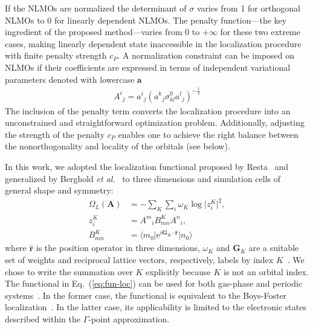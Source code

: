 \documentclass[aps,prl,reprint,amsmath,amssymb]{revtex4-1}
\newcommand*{\imi}{i} %
\newcommand*{\E}{\mathrm{e}}
\newcommand{\ket}[1]{\ensuremath{\vert #1 \rangle}}
\newcommand{\bra}[1]{\ensuremath{\langle #1 \vert}}
\newcommand{\op}[1]{\ensuremath{\hat{#1}}} %
\begin{document}
If the NLMOs are normalized the determinant of $\sigma$ varies from 1 for orthogonal NLMOs to 0 for linearly dependent NLMOs. The penalty function---the key ingredient of the proposed method---varies from 0 to $+\infty$ for these two extreme cases, making linearly dependent state inaccessible in the localization procedure with finite penalty strength $c_P$. 
A normalization constraint can be imposed on NLMOs if their coefficients are expressed in terms of independent variational parameters denoted with lowercase $\mathbf{a}$
%
\begin{equation}
\begin{split}
{A^i}_j = {a^i}_{j} ({a^k}_{j} \sigma^0_{kl}{a^l}_{j})^{-\frac{1}{2}}
\end{split}
\end{equation}
%
The inclusion of the penalty term converts the localization procedure into an unconstrained and straightforward optimization problem. Additionally, adjusting the strength of the penalty $c_P$ enables one to achieve the right balance between the nonorthogonality and locality of the orbitals (see below). 

In this work, we adopted the localization functional proposed by Resta~\cite{resta1998quantum, resta1999electron} and generalized by Berghold \emph{et al.}~\cite{berghold2000general} to three dimensions and simulation cells of general shape and symmetry: 
%
\begin{equation} \label{eq:fun-loc}
\begin{split}
\Omega_L(\mathbf{A}) &= - \sum_K \sum_i \omega_K \log \vert z_{i}^{K} \vert^2, \\
z_{i}^{K} &= {A^m}_i B^{K}_{mn} {A^n}_i, \\
B^{K}_{mn} &= \bra{m_0} \E^{\imi \mathbf{G}_K \cdot \mathbf{\op{r}}} \ket{n_0}
\end{split}
\end{equation}
%
where $\mathbf{\op{r}}$ is the position operator in three dimensions, $\omega_K$ and $\mathbf{G}_K$ are a suitable set of weights and reciprocal lattice vectors, respectively, labels by index $K$~\cite{silvestrelli1999maximally, berghold2000general}. We chose to write the summation over $K$ explicitly because $K$ is not an orbital index. The functional in Eq.~(\ref{eq:fun-loc}) can be used for both gas-phase and periodic systems~\cite{berghold2000general}. In the former case, the functional is equivalent to the Boys-Foster localization~\cite{berghold2000general, resta1999electron}. In the latter case, its applicability is limited to the electronic states described within the $\Gamma$-point approximation.
\end{document}
